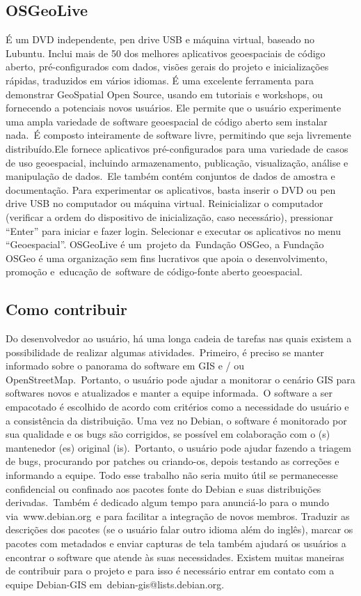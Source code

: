 \subsection{OSGeoLive}

É um DVD independente, pen drive USB e máquina virtual, baseado no Lubuntu. Inclui mais de 50 dos melhores aplicativos geoespaciais de código aberto, pré-configurados com dados, visões gerais do projeto e inicializações rápidas, traduzidos em vários idiomas. É uma excelente ferramenta para demonstrar GeoSpatial Open Source, usando em tutoriais e workshops, ou fornecendo a potenciais novos usuários. Ele permite que o usuário experimente uma ampla variedade de software geoespacial de código aberto sem instalar nada. É composto inteiramente de software livre, permitindo que seja livremente distribuído.Ele fornece aplicativos pré-configurados para uma variedade de casos de uso geoespacial, incluindo armazenamento, publicação, visualização, análise e manipulação de dados. Ele também contém conjuntos de dados de amostra e documentação.
Para experimentar os aplicativos, basta inserir o DVD ou pen drive USB no computador ou máquina virtual. Reinicializar o computador (verificar a ordem do dispositivo de inicialização, caso necessário), pressionar “Enter” para iniciar e fazer login. Selecionar e executar os aplicativos no menu “Geoespacial”.
OSGeoLive é um projeto da Fundação OSGeo, a Fundação OSGeo é uma organização sem fins lucrativos que apoia o desenvolvimento, promoção e educação de software de código-fonte aberto geoespacial.


\subsection{Como contribuir}

Do desenvolvedor ao usuário, há uma longa cadeia de tarefas nas quais existem a possibilidade de realizar algumas atividades. Primeiro, é preciso se manter informado sobre o panorama do software em GIS e / ou OpenStreetMap. Portanto, o usuário pode ajudar a monitorar o cenário GIS para softwares novos e atualizados e manter a equipe informada. O software a ser empacotado é escolhido de acordo com critérios como a necessidade do usuário e a consistência da distribuição.
Uma vez no Debian, o software é monitorado por sua qualidade e os bugs são corrigidos, se possível em colaboração com o (s) mantenedor (es) original (is). Portanto, o usuário pode ajudar fazendo a triagem de bugs, procurando por patches ou criando-os, depois testando as correções e informando a equipe. Todo esse trabalho não seria muito útil se permanecesse confidencial ou confinado aos pacotes fonte do Debian e suas distribuições derivadas. Também é dedicado algum tempo para anunciá-lo para o mundo via www.debian.org e para facilitar a integração de novos membros. Traduzir as descrições dos pacotes (se o usuário falar outro idioma além do inglês), marcar os pacotes com metadados e enviar capturas de tela também ajudará os usuários a encontrar o software que atende às suas necessidades.
Existem muitas maneiras de contribuir para o projeto e para isso é necessário entrar em contato com a equipe Debian-GIS em debian-gis@lists.debian.org.

